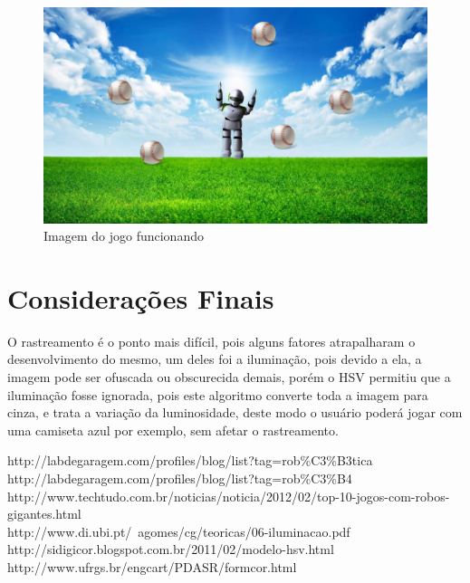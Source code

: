 \documentclass[12pt,openright,oneside,a4paper,brazil]{abntex2}
\begin{document}
\begin{figure}[!htb]
\centering
\includegraphics[scale=0.3]{fundo.jpg}
\caption{Imagem do jogo funcionando}
\end{figure}
\vspace{0.5cm}

\section*{Considerações Finais}

O rastreamento é o ponto mais difícil, pois alguns fatores atrapalharam o desenvolvimento do mesmo, um deles foi a iluminação, pois devido a ela, a imagem pode ser ofuscada ou obscurecida demais, porém o HSV permitiu que a iluminação fosse ignorada, pois este algoritmo converte toda a imagem para cinza, e trata a variação da luminosidade, deste modo o usuário poderá jogar com uma camiseta azul por exemplo, sem afetar o rastreamento.

\begin{thebibliography}{6}
\bibitem *http://labdegaragem.com/profiles/blog/list?tag=rob\%C3\%B3tica \\
\bibitem *http://labdegaragem.com/profiles/blog/list?tag=rob\%C3\%B4 \\
\bibitem *http://www.techtudo.com.br/noticias/noticia/2012/02/top-10-jogos-com-robos-gigantes.html \\
\bibitem *http://www.di.ubi.pt/~agomes/cg/teoricas/06-iluminacao.pdf \\
\bibitem *http://sidigicor.blogspot.com.br/2011/02/modelo-hsv.html \\
\bibitem *http://www.ufrgs.br/engcart/PDASR/formcor.html

\end{thebibliography}
\end{document}
